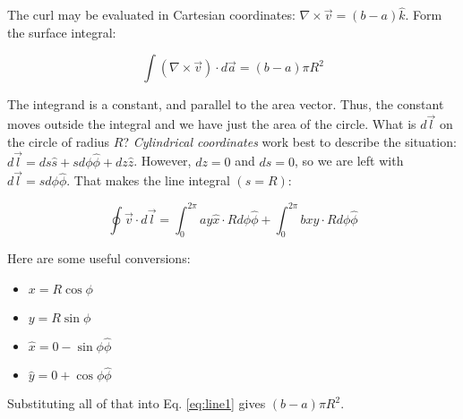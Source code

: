 \documentclass[10pt]{article}
\begin{document}
The curl may be evaluated in Cartesian coordinates: $\nabla \times \vec{v} = (b-a)\hat{k}$.  Form the surface integral:

\begin{equation}
\int (\nabla \times \vec{v}) \cdot d\vec{a} = (b-a) \pi R^2
\end{equation}

The integrand is a constant, and parallel to the area vector.  Thus, the constant moves outside the integral and we have just the area of the circle.  What is $d\vec{l}$ on the circle of radius $R$?  \textit{Cylindrical coordinates} work best to describe the situation: $d\vec{l} = ds \hat{s} + s d\phi \hat{\phi} + dz \hat{z}$.  However, $dz = 0$ and $ds = 0$, so we are left with $d\vec{l} = s d\phi \hat{\phi}$.  That makes the line integral $(s = R)$:

\begin{equation}
\oint \vec{v} \cdot d\vec{l} = \int_0^{2\pi} ay \hat{x} \cdot R d\phi \hat{\phi} + \int_0^{2\pi} bx \hat{y} \cdot R d\phi \hat{\phi} \label{eq:line1}
\end{equation}

Here are some useful conversions:
\begin{itemize}
\item $x = R\cos\phi$
\item $y = R\sin\phi$
\item $\hat{x} = 0 - \sin\phi \hat{\phi}$
\item $\hat{y} = 0 + \cos\phi \hat{\phi}$
\end{itemize}
Substituting all of that into Eq. \ref{eq:line1} gives $(b-a) \pi R^2$.
\end{document}
